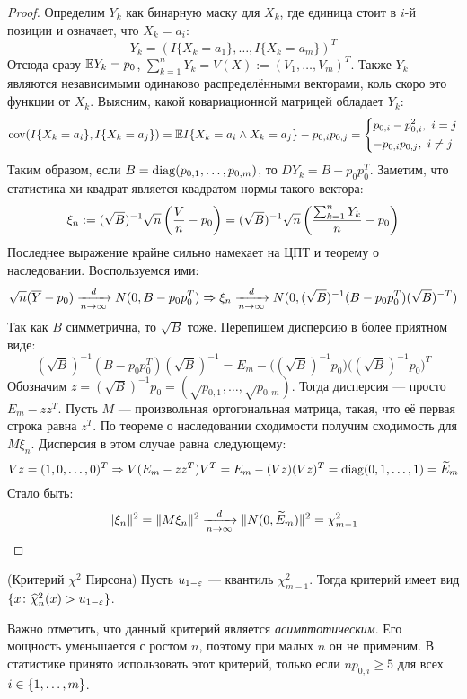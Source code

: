 \begin{proof}
	Определим $Y_k$ как бинарную маску для $X_k$, где единица стоит в $i$-й позиции и означает, что $X_k = a_i$:
	\[
		Y_k = (I\{X_k = a_1\}, \ldots, I\{X_k = a_m\})^T
	\]
	Отсюда сразу $\mathbb{E} Y_k = p_0$, $\sum_{k = 1}^n Y_k = V(X) := (V_1, \ldots, V_m)^T$. Также $Y_k$ являются независимыми одинаково распределёнными векторами, коль скоро это функции от $X_k$. Выясним, какой ковариационной матрицей обладает $Y_k$:
	\[
		\operatorname{cov}(I\{X_k = a_i\}, I\{X_k = a_j\}) = \mathbb{E} I\{X_k = a_i \wedge X_k = a_j\} - p_{0, i}p_{0, j} = \left\{\begin{aligned}
			&{p_{0, i} - p_{0, i}^2,\ i = j}
			\\
			&{-p_{0, i}p_{0, j},\ i \neq j}
		\end{aligned}\right.
	\]
	Таким образом, если $B = \operatorname{diag}(p_{0, 1}, \ldots, p_{0, m})$, то $D Y_k = B - p_0p_0^T$. Заметим, что статистика хи-квадрат является квадратом нормы такого вектора:
	\[
		\xi_n := (\sqrt{B})^{-1}\sqrt{n}\left(\frac{V}{n} - p_0\right) = (\sqrt{B})^{-1}\sqrt{n}\left(\frac{\sum_{k = 1}^n Y_k}{n} - p_0\right)
	\]
	Последнее выражение крайне сильно намекает на ЦПТ и теорему о наследовании. Воспользуемся ими:
	\[
		\sqrt{n}(\overline{Y} - p_0) \xrightarrow[n \to \infty]{d} N(0, B - p_0p_0^T) \Rightarrow \xi_n \xrightarrow[n \to \infty]{d} N(0, (\sqrt{B})^{-1}(B - p_0p_0^T)(\sqrt{B})^{-T})
	\]
	Так как $B$ симметрична, то $\sqrt{B}$ тоже. Перепишем дисперсию в более приятном виде:
	\[
		(\sqrt{B})^{-1}(B - p_0p_0^T)(\sqrt{B})^{-1} = E_m - \big((\sqrt{B})^{-1}p_0\big)\big((\sqrt{B})^{-1}p_0\big)^T
	\]
	Обозначим $z = (\sqrt{B})^{-1}p_0 = (\sqrt{p_{0, 1}}, \ldots, \sqrt{p_{0, m}})$. Тогда дисперсия --- просто $E_m - zz^T$. Пусть $M$ --- произвольная ортогональная матрица, такая, что её первая строка равна $z^T$. По теореме о наследовании сходимости получим сходимость для $M\xi_n$. Дисперсия в этом случае равна следующему:
	\[
		Vz = (1, 0, \ldots, 0)^T \Rightarrow V(E_m - zz^T)V^T = E_m - (Vz)(Vz)^T = \operatorname{diag}(0, 1, \ldots, 1) = \widetilde{E}_m
	\]
	Стало быть:
	\[
		\|\xi_n\|^2 = \|M\xi_n\|^2 \xrightarrow[n \to \infty]{d} \|N(0, \widetilde{E}_m)\|^2 = \chi_{m - 1}^2
	\]
\end{proof}

\begin{solution} (Критерий $\chi^2$ Пирсона)
	Пусть $u_{1 - \varepsilon}$ --- квантиль $\chi_{m - 1}^2$. Тогда критерий имеет вид $\{x \colon \widehat{\chi}_n^2(x) > u_{1 - \varepsilon}\}$.
\end{solution}

\begin{note}
	Важно отметить, что данный критерий является \textit{асимптотическим}. Его мощность уменьшается с ростом $n$, поэтому при малых $n$ он не применим. В статистике принято использовать этот критерий, только если $np_{0, i} \ge 5$ для всех $i \in \{1, \ldots, m\}$.
\end{note}

